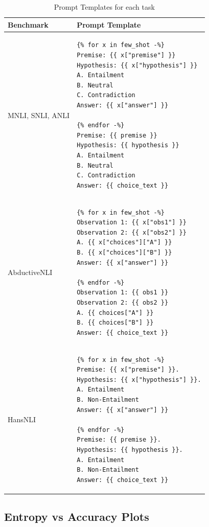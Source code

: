 \begin{table}[t]
    \centering
    \small
    \begin{tabular}{lp{8cm}}
        \toprule
        \textbf{Benchmark} & \textbf{Prompt Template} \\
        \midrule
        MNLI, SNLI, ANLI & \begin{verbatim}
{% for x in few_shot -%}
Premise: {{ x["premise"] }}
Hypothesis: {{ x["hypothesis"] }}
A. Entailment
B. Neutral
C. Contradiction
Answer: {{ x["answer"] }}

{% endfor -%}
Premise: {{ premise }}
Hypothesis: {{ hypothesis }}
A. Entailment
B. Neutral
C. Contradiction
Answer: {{ choice_text }}
\end{verbatim} \\
\midrule
AbductiveNLI & \begin{verbatim}
{% for x in few_shot -%}
Observation 1: {{ x["obs1"] }}
Observation 2: {{ x["obs2"] }}
A. {{ x["choices"]["A"] }}
B. {{ x["choices"]["B"] }}
Answer: {{ x["answer"] }}

{% endfor -%}
Observation 1: {{ obs1 }}
Observation 2: {{ obs2 }}
A. {{ choices["A"] }}
B. {{ choices["B"] }}
Answer: {{ choice_text }}
\end{verbatim} \\
\midrule
HansNLI & \begin{verbatim}
{% for x in few_shot -%}
Premise: {{ x["premise"] }}.
Hypothesis: {{ x["hypothesis"] }}.
A. Entailment
B. Non-Entailment
Answer: {{ x["answer"] }}

{% endfor -%}
Premise: {{ premise }}.
Hypothesis: {{ hypothesis }}.
A. Entailment
B. Non-Entailment
Answer: {{ choice_text }}
\end{verbatim} \\
\bottomrule
\end{tabular}
\caption{Prompt Templates for each task}
\label{tab:prompt_template}
\end{table}

\subsection{Entropy vs Accuracy Plots}


